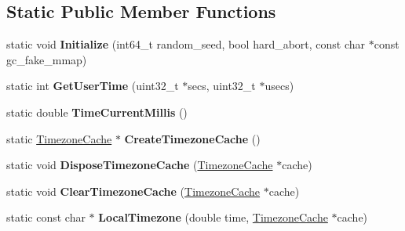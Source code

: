 \subsection*{Static Public Member Functions}
\begin{DoxyCompactItemize}
\item 
static void {\bfseries Initialize} (int64\+\_\+t random\+\_\+seed, bool hard\+\_\+abort, const char $\ast$const gc\+\_\+fake\+\_\+mmap)\hypertarget{classv8_1_1base_1_1_o_s_a4222be2e5c52562f58e777de67874544}{}\label{classv8_1_1base_1_1_o_s_a4222be2e5c52562f58e777de67874544}

\item 
static int {\bfseries Get\+User\+Time} (uint32\+\_\+t $\ast$secs, uint32\+\_\+t $\ast$usecs)\hypertarget{classv8_1_1base_1_1_o_s_ab14abe0c27358916e32d1d5552ac182f}{}\label{classv8_1_1base_1_1_o_s_ab14abe0c27358916e32d1d5552ac182f}

\item 
static double {\bfseries Time\+Current\+Millis} ()\hypertarget{classv8_1_1base_1_1_o_s_ad95b9514ae4123f8d0a5456d6f2cc204}{}\label{classv8_1_1base_1_1_o_s_ad95b9514ae4123f8d0a5456d6f2cc204}

\item 
static \hyperlink{classv8_1_1base_1_1_timezone_cache}{Timezone\+Cache} $\ast$ {\bfseries Create\+Timezone\+Cache} ()\hypertarget{classv8_1_1base_1_1_o_s_ad481e6ce21d8194ec47b14e59e8aadaf}{}\label{classv8_1_1base_1_1_o_s_ad481e6ce21d8194ec47b14e59e8aadaf}

\item 
static void {\bfseries Dispose\+Timezone\+Cache} (\hyperlink{classv8_1_1base_1_1_timezone_cache}{Timezone\+Cache} $\ast$cache)\hypertarget{classv8_1_1base_1_1_o_s_adc5b661ec42642534d035aa85fd61c94}{}\label{classv8_1_1base_1_1_o_s_adc5b661ec42642534d035aa85fd61c94}

\item 
static void {\bfseries Clear\+Timezone\+Cache} (\hyperlink{classv8_1_1base_1_1_timezone_cache}{Timezone\+Cache} $\ast$cache)\hypertarget{classv8_1_1base_1_1_o_s_a4fe06d814da2df94a01b4b205e35088c}{}\label{classv8_1_1base_1_1_o_s_a4fe06d814da2df94a01b4b205e35088c}

\item 
static const char $\ast$ {\bfseries Local\+Timezone} (double time, \hyperlink{classv8_1_1base_1_1_timezone_cache}{Timezone\+Cache} $\ast$cache)\hypertarget{classv8_1_1base_1_1_o_s_a96050b050e19b019c807669f70ac4978}{}\label{classv8_1_1base_1_1_o_s_a96050b050e19b019c807669f70ac4978}


\end{DoxyCompactItemize}
